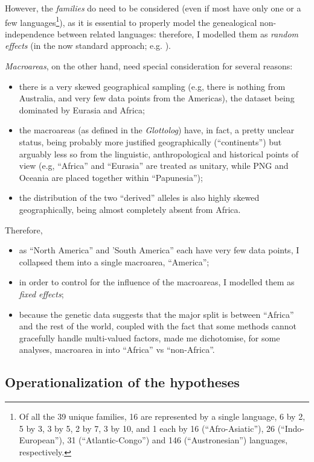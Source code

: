 \documentclass[twoside,onecolumn]{article}
\begin{document}
However, the \emph{families} do need to be considered (even if most have only one or a few languages\footnote{Of all the 39 unique families, 16 are represented by a single language, 6 by 2, 5 by 3, 3 by 5, 2 by 7, 3 by 10, and 1 each by 16 (``Afro-Asiatic''), 26 (``Indo-European''), 31 (``Atlantic-Congo'') and 146 (``Austronesian'') languages, respectively.}), as it is essential to properly model the genealogical non-independence between related languages: therefore, I modelled them as \emph{random effects} (in the now standard approach; e.g. \citealp{ladd_correlational_2015}).

\emph{Macroareas}, on the other hand, need special consideration for several reasons:

\begin{itemize}
  \item there is a very skewed geographical sampling (e.g, there is nothing from Australia, and very few data points from the Americas), the dataset being dominated by Eurasia and Africa;
  \item the macroareas (as defined in the \textit{Glottolog}) have, in fact, a pretty unclear status, being probably more justified geographically (``continents'') but arguably less so from the linguistic, anthropological and historical points of view (e.g, ``Africa'' and ``Eurasia'' are treated as unitary, while PNG and Oceania are placed together within ``Papunesia'');
  \item the distribution of the two ``derived'' alleles is also highly skewed geographically, being almost completely absent from Africa.
\end{itemize}

Therefore,

\begin{itemize}
  \item as ``North America'' and 'South America'' each have very few data points, I collapsed them into a single macroarea, ``America'';
  \item in order to control for the influence of the macroareas, I modelled them as \emph{fixed effects};
  \item because the genetic data suggests that the major split is between ``Africa'' and the rest of the world, coupled with the fact that some methods cannot gracefully handle multi-valued factors, made me dichotomise, for some analyses, macroarea in into ``Africa'' vs ``non-Africa''.
\end{itemize}


\subsection{Operationalization of the hypotheses}
\end{document}
